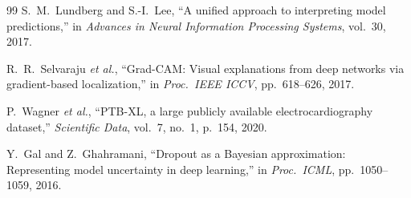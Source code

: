 \documentclass[journal, 10pt, twoside]{IEEEtran}
\begin{document}
\begin{thebibliography}{99}
S.~M.~Lundberg and S.-I.~Lee,
``A unified approach to interpreting model predictions,''
in \textit{Advances in Neural Information Processing Systems}, vol.~30, 2017.

R.~R.~Selvaraju \textit{et al.},
``Grad-CAM: Visual explanations from deep networks via gradient-based
  localization,''
in \textit{Proc.\ IEEE ICCV}, pp.~618--626, 2017.

P.~Wagner \textit{et al.},
``PTB-XL, a large publicly available electrocardiography dataset,''
\textit{Scientific Data}, vol.~7, no.~1, p.~154, 2020.

Y.~Gal and Z.~Ghahramani,
``Dropout as a Bayesian approximation: Representing model uncertainty
  in deep learning,''
in \textit{Proc.\ ICML}, pp.~1050--1059, 2016.

\end{thebibliography}

\balance
\end{document}
